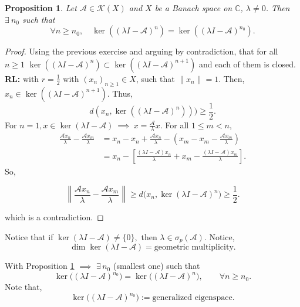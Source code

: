 \documentclass[12pt, oneside]{book}
\newtheorem{prop}{Proposition}[section]
\begin{document}
\begin{prop}\label{1.2.2}
Let	$\mathscr{A}\in\mathcal{K}(X)$ and $X$ be a Banach space on $\mathbb{C}$, $\lambda\neq0$.
	Then $\exists \ n_0$ such that
	\[
	\forall n\ge n_0,\quad
	\ker((\lambda I-\mathscr{A})^n)=\ker((\lambda I-\mathscr{A})^{n_0}).
	\]
\end{prop}		
\begin{proof}
	Using the previous exercise and arguing by contradiction, that for all $n\geq 1$ $\ker((\lambda I-\mathscr{A})^n)\subset \ker((\lambda I-\mathscr{A})^{n+1})$ and each of them is closed.\\
	\textbf{RL:} with $r=\frac{1}{2}$ with $(x_n)_{n\geq 1} \in X$, such that $\|x_n\|=1$. Then, $x_n\in \ker((\lambda I-\mathscr{A})^{n+1})$. Thus,
	$$d(x_n,\ker((\lambda I-\mathscr{A})^n)))\geq \frac{1}{2}.$$
For $n=1,x\in \ker(\lambda I-\mathscr{A})\ \implies\ x=\frac{\mathscr{A}}{\lambda}x.$
For all $1\le m<n$,
\begin{align*}
	\frac{\mathscr{A}x_n}{\lambda}-\frac{\mathscr{A}x_m}{\lambda}
	&= x_n-x_n+\frac{\mathscr{A}x_n}{\lambda}-\left(x_m-x_m-\frac{\mathscr{A}x_m}{\lambda}\right) \\
	&= x_n-\left[\frac{(\lambda I-\mathscr{A})x_n}{\lambda}+x_m-\frac{(\lambda I-\mathscr{A})x_m}{\lambda}\right].
\end{align*}
So,

\[
\left\|\frac{\mathscr{A}x_n}{\lambda}-\frac{\mathscr{A}x_m}{\lambda}\right\|
\ge d\bigl(x_n,\ker(\lambda I-\mathscr{A})^n\bigr)
\ge \frac12.
\]

\medskip
which is a contradiction.
\end{proof}		
Notice that if
$
\ker(\lambda I-\mathscr{A})\ne \{0\},
$
then
$
\lambda\in \sigma_p(\mathscr{A}).
$ Notice,
\vspace{-2mm}
\[
\dim \ker(\lambda I-\mathscr{A})=\text{geometric multiplicity}.
\]

With Proposition \ref{1.2.2} $\implies$ $\exists\, n_0$ (smallest one) such that
\vspace{-2mm}
\[
\ker\bigl((\lambda I-\mathscr{A})^{n_0}\bigr)
=
\ker\bigl((\lambda I-\mathscr{A})^n\bigr),
\qquad \forall n\ge n_0.
\]
Note that,
\[
\ker\bigl((\lambda I-\mathscr{A})^{n_0}\bigr)
:=\text{generalized eigenspace}.
\]
\end{document}
